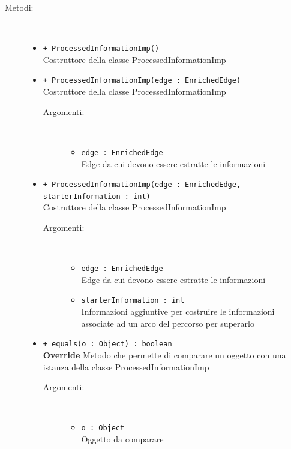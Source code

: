 \documentclass[../DefinizioneDiProdotto.tex]{subfiles}
\begin{document}
\begin{description}
\begin{itemize}
	\end{itemize}
	\item[Metodi:] \
	\begin{itemize}
		\item \texttt{+ ProcessedInformationImp()}\\
		Costruttore della classe ProcessedInformationImp
		\item \texttt{+ ProcessedInformationImp(edge : EnrichedEdge)}\\
		Costruttore della classe ProcessedInformationImp
		\begin{description}
			\item[Argomenti:] \
			\begin{itemize}
				\item \texttt{edge : EnrichedEdge}\\
				Edge da cui devono essere estratte le informazioni\end{itemize}
		\end{description}
		\item \texttt{+ ProcessedInformationImp(edge : EnrichedEdge, starterInformation : int)}\\
		Costruttore della classe ProcessedInformationImp
		\begin{description}
			\item[Argomenti:] \
			\begin{itemize}
				\item \texttt{edge : EnrichedEdge}\\
				Edge da cui devono essere estratte le informazioni\item \texttt{starterInformation : int}\\
				Informazioni aggiuntive per costruire le informazioni associate ad un arco del percorso per superarlo\end{itemize}
		\end{description}
		\item \texttt{+ equals(o : Object) : boolean}\\
		\textbf{Override} Metodo che permette di comparare un oggetto con una istanza della classe ProcessedInformationImp
		\begin{description}
			\item[Argomenti:] \
			\begin{itemize}
				\item \texttt{o : Object}\\
				Oggetto da comparare\end{itemize}
		\end{description}

\end{itemize}
\end{description}
\end{document}
